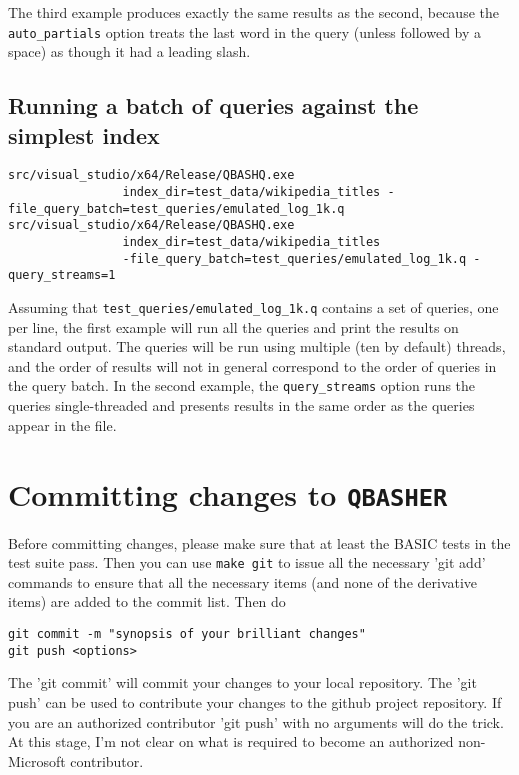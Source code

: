 \documentclass{article}
\newcommand{\projectName}{\texttt{QBASHER}}
\begin{document}
\noindent The third example produces exactly the same results as the second,
because the \texttt{auto\_partials} option treats the last word in the
query (unless followed by a space) as though it had a leading slash.


\subsection{Running a batch of queries against the simplest index}
{\footnotesize
\begin{verbatim}
src/visual_studio/x64/Release/QBASHQ.exe
                index_dir=test_data/wikipedia_titles -file_query_batch=test_queries/emulated_log_1k.q 
src/visual_studio/x64/Release/QBASHQ.exe
                index_dir=test_data/wikipedia_titles
                -file_query_batch=test_queries/emulated_log_1k.q -query_streams=1
\end{verbatim}
}

Assuming that \texttt{test\_queries/emulated\_log\_1k.q} contains a
set of queries, one per line, the first example will run all the
queries and print the results on standard output.   The queries will
be run using multiple (ten by default) threads, and the order of
results will not in general correspond to the order of queries in the
query batch.   In the second example, the \texttt{query\_streams}
option runs the queries single-threaded and presents results in the
same order as the queries appear in the file.

\section{Committing changes to \projectName}

Before committing changes, please make sure that at least the BASIC
tests in the test suite pass.  Then you can use \texttt{make git} to
issue all the necessary 'git add' commands to ensure that all the
necessary items (and none of the derivative items) are added to the
commit list.   Then do 
\begin{verbatim}
git commit -m "synopsis of your brilliant changes"
git push <options>
\end{verbatim}

The 'git commit' will commit your changes to your local repository.
The 'git push' can be used to contribute your changes to the github
project repository.  If you are an authorized contributor 'git push'
with no arguments will do the trick.   At this stage, I'm not clear on
what is required to become an authorized non-Microsoft contributor.
\end{document}
